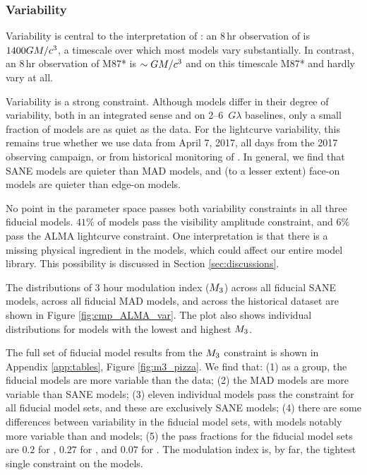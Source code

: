 \subsubsection{Variability}

Variability is central to  the interpretation of \sgra: an $8\,\mathrm{hr}$ observation of \sgra is $1400 GM/c^3$, a timescale over which most models vary substantially.
In contrast, an $8\,\mathrm{hr}$ observation of M87* is $\sim GM/c^3$ and on this timescale M87* and \sgra hardly vary at all.

Variability is a strong constraint.
Although models differ in their degree of variability, both in an integrated sense and on 2--6~$G\lambda$ baselines, only a small fraction of models are as quiet as the data.
For the lightcurve variability, this remains true whether we use data from April 7, 2017, all days from the 2017 observing campaign, or from historical monitoring of \sgra.
 In general, we find that SANE models are quieter than MAD models, and (to a lesser extent) face-on models are quieter than edge-on models.

No point in the parameter space passes both variability constraints in all three fiducial models.
$41\%$ of models pass the visibility amplitude constraint, and $6\%$ pass the ALMA lightcurve constraint.
One interpretation is that there is a missing physical ingredient in the models, which could affect our entire model library.
This possibility is discussed in Section \ref{sec:discussions}.


The distributions of 3 hour modulation index ($M_{3}$) across all fiducial SANE models, across all fiducial MAD models, and across the historical dataset are shown in Figure \ref{fig:cmp_ALMA_var}.
The plot also shows individual distributions for models with the lowest and highest $M_{3}$.

The full set of fiducial model results from the $M_{3}$ constraint is shown in Appendix \ref{app:tables}, Figure \ref{fig:m3_pizza}.
We find that: (1) as a group, the fiducial models are more variable than the data; (2) the MAD models are more variable than SANE models; (3) eleven individual models  pass the constraint for all fiducial model sets, and these are exclusively SANE models; (4) there are some differences between variability in the fiducial model sets, with \hamr models notably more variable than \kharma and \bhac models; (5) the pass fractions for the fiducial model sets are $0.2$ for \kharma, $0.27$ for \bhac, and $0.07$ for \hamr.
 The modulation index is, by far, the tightest single constraint on the models.


